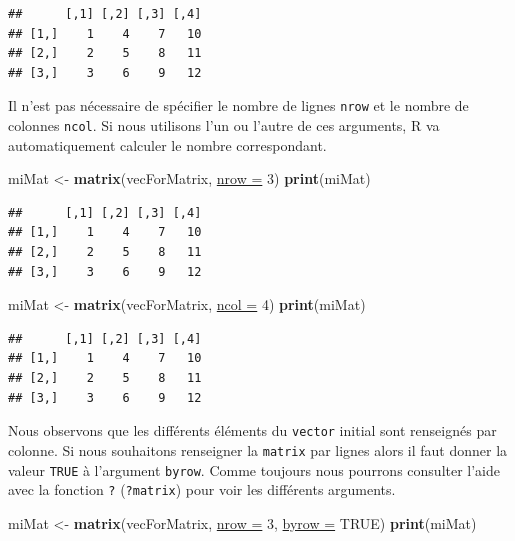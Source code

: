 \documentclass[twoside,symmetric]{book}
\newenvironment{Shaded}{}{}
\newcommand{\DataTypeTok}[1]{\underline{#1}}
\newcommand{\DecValTok}[1]{#1}
\newcommand{\KeywordTok}[1]{\textbf{#1}}
\newcommand{\NormalTok}[1]{#1}
\newcommand{\OtherTok}[1]{#1}
\newcommand{\StringTok}[1]{#1}
\begin{document}
\begin{verbatim}
##      [,1] [,2] [,3] [,4]
## [1,]    1    4    7   10
## [2,]    2    5    8   11
## [3,]    3    6    9   12
\end{verbatim}

Il n'est pas nécessaire de spécifier le nombre de lignes \texttt{nrow} et le nombre de colonnes \texttt{ncol}. Si nous utilisons l'un ou l'autre de ces arguments, R va automatiquement calculer le nombre correspondant.

\begin{Shaded}
\begin{Highlighting}[]
\NormalTok{miMat <-}\StringTok{ }\KeywordTok{matrix}\NormalTok{(vecForMatrix, }\DataTypeTok{nrow =} \DecValTok{3}\NormalTok{)}
\KeywordTok{print}\NormalTok{(miMat)}
\end{Highlighting}
\end{Shaded}

\begin{verbatim}
##      [,1] [,2] [,3] [,4]
## [1,]    1    4    7   10
## [2,]    2    5    8   11
## [3,]    3    6    9   12
\end{verbatim}

\begin{Shaded}
\begin{Highlighting}[]
\NormalTok{miMat <-}\StringTok{ }\KeywordTok{matrix}\NormalTok{(vecForMatrix, }\DataTypeTok{ncol =} \DecValTok{4}\NormalTok{)}
\KeywordTok{print}\NormalTok{(miMat)}
\end{Highlighting}
\end{Shaded}

\begin{verbatim}
##      [,1] [,2] [,3] [,4]
## [1,]    1    4    7   10
## [2,]    2    5    8   11
## [3,]    3    6    9   12
\end{verbatim}

Nous observons que les différents éléments du \texttt{vector} initial sont renseignés par colonne. Si nous souhaitons renseigner la \texttt{matrix} par lignes alors il faut donner la valeur \texttt{TRUE} à l'argument \texttt{byrow}. Comme toujours nous pourrons consulter l'aide avec la fonction \texttt{?} (\texttt{?matrix}) pour voir les différents arguments.

\begin{Shaded}
\begin{Highlighting}[]
\NormalTok{miMat <-}\StringTok{ }\KeywordTok{matrix}\NormalTok{(vecForMatrix, }\DataTypeTok{nrow =} \DecValTok{3}\NormalTok{, }\DataTypeTok{byrow =} \OtherTok{TRUE}\NormalTok{)}
\KeywordTok{print}\NormalTok{(miMat)}
\end{Highlighting}
\end{Shaded}
\end{document}
